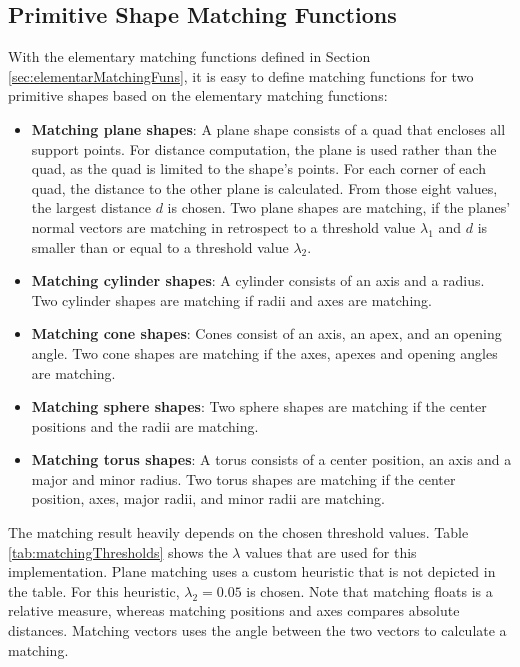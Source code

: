 \subsection{Primitive Shape Matching Functions}
\label{sec:primitiveShapeMatchingFuns}

With the elementary matching functions defined in Section \ref{sec:elementarMatchingFuns}, it is easy to define matching functions for two primitive shapes based on the elementary matching functions:

\begin{itemize}
\item \textbf{Matching plane shapes}: 
A plane shape consists of a quad that encloses all support points. For distance computation, the plane is used rather than the quad, as the quad is limited to the shape's points. For each corner of each quad, the distance to the other plane is calculated. From those eight values, the largest distance $d$ is chosen. Two plane shapes are matching, if the planes' normal vectors are matching in retrospect to a threshold value $\lambda_1$ and $d$ is smaller than or equal to a threshold value $\lambda_2$.
\item \textbf{Matching cylinder shapes}: 
A cylinder consists of an axis and a radius. Two cylinder shapes are matching if radii and axes are matching. 
\item \textbf{Matching cone shapes}:
Cones consist of an axis, an apex, and an opening angle. Two cone shapes are matching if the axes, apexes and opening angles are matching. 
\item \textbf{Matching sphere shapes}: 
Two sphere shapes are matching if the center positions and the radii are matching. 
\item \textbf{Matching torus shapes}: 
A torus consists of a center position, an axis and a major and minor radius. Two torus shapes are matching if the center position, axes, major radii, and minor radii are matching. 
\end{itemize}

The matching result heavily depends on the chosen threshold values. Table \ref{tab:matchingThresholds} shows the $\lambda$ values that are used for this implementation. Plane matching uses a custom heuristic that is not depicted in the table. For this heuristic, $\lambda_2 = 0.05$ is chosen. Note that matching floats is a relative measure, whereas matching positions and axes compares absolute distances. Matching vectors uses the angle between the two vectors to calculate a matching. 

